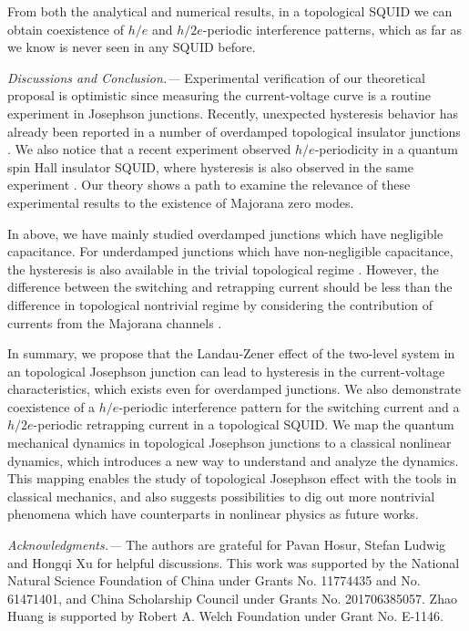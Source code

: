 \documentclass[aps,prl,twocolumn,showpacs,showpacs,10pt,superscriptaddress]{revtex4-1}
\begin{document}
From both the analytical and numerical results, in a topological SQUID we can obtain coexistence of $h/e$ and $h/2e$-periodic interference patterns, which as far as we know is never seen in any SQUID before.

{\it Discussions and Conclusion.---}
 Experimental verification of our theoretical proposal is optimistic since
measuring the current-voltage curve is a routine experiment in Josephson junctions. Recently, unexpected hysteresis behavior has already been reported in a number of overdamped topological insulator junctions \cite{molenkamp13,molenkamp16}. We also notice that a recent experiment observed $h/e$-periodicity in a quantum spin Hall insulator SQUID, where hysteresis is also observed in the same experiment \cite{kouwenhoven15}. Our theory shows a path to examine the relevance of these experimental results to the existence of Majorana zero modes.

In above, we have mainly studied overdamped junctions which have negligible capacitance. For underdamped junctions which have non-negligible capacitance, the hysteresis is also available in the trivial topological regime \cite{tinkhambook}. However, the difference between the switching and retrapping current should be less than the difference in topological nontrivial regime by considering the contribution of currents from the Majorana channels \cite{supplement}.


In summary, we propose that the Landau-Zener effect of the two-level system in an topological Josephson junction can lead to hysteresis in the current-voltage characteristics, which exists even for overdamped junctions. We also demonstrate coexistence of a $h/e$-periodic interference pattern for the switching current and a $h/2e$-periodic retrapping current in a topological SQUID. We map the quantum mechanical dynamics in topological Josephson junctions to a classical nonlinear dynamics, which introduces a new way to understand and analyze the dynamics. This mapping enables the study of topological Josephson effect with the tools in classical mechanics, and also suggests possibilities to dig out more nontrivial phenomena which have counterparts in nonlinear physics as future works.

\acknowledgments
{\it Acknowledgments.---}
The authors are grateful for Pavan Hosur, Stefan Ludwig and Hongqi Xu for helpful discussions. This work was supported by the National Natural Science Foundation of China under Grants No. 11774435 and No. 61471401, and China Scholarship Council under Grants No. 201706385057. Zhao Huang is supported by Robert A. Welch Foundation under Grant No. E-1146.
\end{document}
